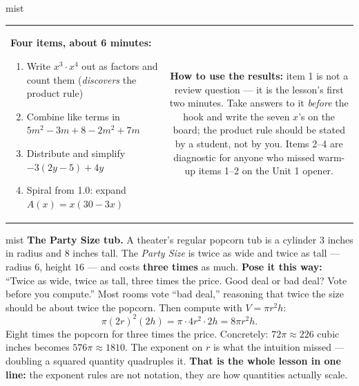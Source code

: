 \documentclass[10pt]{article}
\begin{document}
\begin{fixedskillbox}{mist}
\begin{tabularx}{\linewidth}{@{}X c@{}}
\begin{minipage}[t]{0.55\linewidth}\vspace{0pt}
\textbf{Four items, about 6 minutes:}
\begin{enumerate}[leftmargin=1.4em, itemsep=1pt, topsep=2pt]
  \item Write $x^3\cdot x^4$ out as factors and count them (\emph{discovers} the product rule)
  \item Combine like terms in $5m^2-3m+8-2m^2+7m$
  \item Distribute and simplify $-3(2y-5)+4y$
  \item Spiral from 1.0: expand $A(x)=x(30-3x)$
\end{enumerate}
\end{minipage}
&
\begin{minipage}[t]{0.38\linewidth}\vspace{0pt}
\textbf{How to use the results:} item 1 is not a review question --- it is the lesson's first two
minutes. Take answers to it \emph{before} the hook and write the seven $x$'s on the board; the
product rule should be stated by a student, not by you. Items 2--4 are diagnostic for anyone who
missed warm-up items 1--2 on the Unit 1 opener.
\end{minipage}
\end{tabularx}
\end{fixedskillbox}

\begin{skillbox}[Hook]{mist}
\textbf{The Party Size tub.} A theater's regular popcorn tub is a cylinder $3$ inches in radius
and $8$ inches tall. The \emph{Party Size} is twice as wide and twice as tall --- radius $6$,
height $16$ --- and costs \textbf{three times} as much. \textbf{Pose it this way:} ``Twice as wide,
twice as tall, three times the price. Good deal or bad deal? Vote before you compute.'' Most rooms
vote ``bad deal,'' reasoning that twice the size should be about twice the popcorn. Then compute
with $V=\pi r^2h$:
\[ \pi(2r)^2(2h) = \pi\cdot 4r^2\cdot 2h = 8\pi r^2h. \]
Eight times the popcorn for three times the price. Concretely: $72\pi \approx 226$ cubic inches
becomes $576\pi \approx 1810$. The exponent on $r$ is what the intuition missed --- doubling a
squared quantity quadruples it. \textbf{That is the whole lesson in one line:} the exponent rules
are not notation, they are how quantities actually scale.
\end{skillbox}
\end{document}
